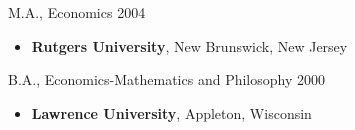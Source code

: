 \documentclass[11pt]{article}
\makeatletter
\newlength{\bibhang}
\newlength{\bibsep}
 {\@listi \global\bibsep\itemsep \global\advance\bibsep by\parsep}
\newenvironment{bibsection}%
        {\begin{list}{}{%
       \setlength{\leftmargin}{\bibhang}%
       \setlength{\itemindent}{-\leftmargin}%
       \setlength{\itemsep}{\bibsep}%
       \setlength{\parsep}{\z@}%
        \setlength{\partopsep}{0pt}%
        \setlength{\topsep}{0pt}}}
        {\end{list}\vspace{-.6\baselineskip}}
\renewcommand{\section}[1]{\pagebreak[3]%
    \hyphenpenalty=10000%
    \vspace{1.3\baselineskip}%
    \phantomsection\addcontentsline{toc}{section}{#1}%
    \noindent\llap{\scshape\smash{\parbox[t]{\marginparwidth}{\raggedright #1}}}%
    \vspace{-\baselineskip}\par}
\newenvironment{innerlist}[1][\enskip\textbullet]%
        {\begin{itemize}[#1,leftmargin=*,parsep=0pt,itemsep=0pt,topsep=0pt,partopsep=0pt]}
        {\end{itemize}}
\makeatother
\begin{document}
%

\vspace{5pt}

M.A., Economics \hfill{2004} 
\begin{innerlist}
	\item[] \textbf{Rutgers University}, New Brunswick, New Jersey 
\end{innerlist}

\vspace{5pt}

B.A., Economics-Mathematics and Philosophy \hfill{2000} 
\begin{innerlist}
	\item[] \textbf{Lawrence University}, Appleton, Wisconsin 
\end{innerlist}




%
	




%

%
%
\end{document}
